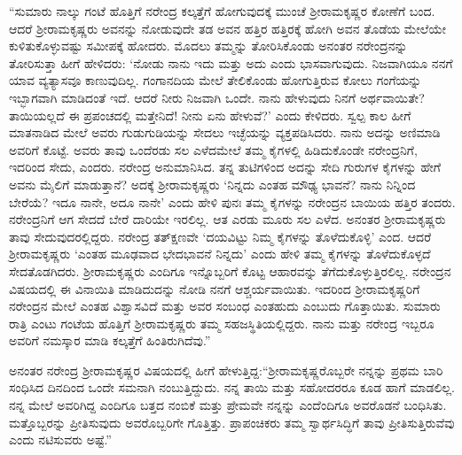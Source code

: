 “ಸುಮಾರು ನಾಲ್ಕು ಗಂಟೆ ಹೊತ್ತಿಗೆ ನರೇಂದ್ರ ಕಲ್ಕತ್ತೆಗೆ ಹೋಗುವುದಕ್ಕೆ ಮುಂಚೆ ಶ‍್ರೀರಾಮಕೃಷ್ಣರ ಕೋಣೆಗೆ ಬಂದ. ಆದರೆ ಶ‍್ರೀರಾಮಕೃಷ್ಣರು ಅವನನ್ನು ನೋಡುವುದೇ ತಡ ಅವನ ಹತ್ತಿರ ಹತ್ತಿರಕ್ಕೆ ಹೋಗಿ ಅವನ ತೊಡೆಯ ಮೇಲೆಯೇ ಕುಳಿತುಕೊಳ್ಳುವಷ್ಟು ಸಮೀಪಕ್ಕೆ ಹೋದರು. ಮೊದಲು ತಮ್ಮನ್ನು ತೋರಿಸಿಕೊಂಡು ಅನಂತರ ನರೇಂದ್ರನನ್ನು ತೋರಿಸುತ್ತಾ ಹೀಗೆ ಹೇಳಿದರು: ‘ನೋಡು ನಾನು ಇದು ಮತ್ತು ಅದು ಎಂದು ಭಾಸವಾಗುವುದು. ನಿಜವಾಗಿಯೂ ನನಗೆ ಯಾವ ವ್ಯತ್ಯಾಸವೂ ಕಾಣುವುದಿಲ್ಲ. ಗಂಗಾನದಿಯ ಮೇಲೆ ತೇಲಿಕೊಂಡು ಹೋಗುತ್ತಿರುವ ಕೋಲು ಗಂಗೆಯನ್ನು ಇಬ್ಭಾಗವಾಗಿ ಮಾಡಿದಂತೆ ಇದೆ. ಆದರೆ ನೀರು ನಿಜವಾಗಿ ಒಂದೇ. ನಾನು ಹೇಳುವುದು ನಿನಗೆ ಅರ್ಥವಾಯಿತೇ? ತಾಯಿಯಲ್ಲದೆ ಈ ಪ್ರಪಂಚದಲ್ಲಿ ಮತ್ತೇನಿದೆ! ನೀನು ಏನು ಹೇಳುವೆ?’ ಎಂದು ಕೇಳಿದರು. ಸ್ವಲ್ಪ ಕಾಲ ಹೀಗೆ ಮಾತನಾಡಿದ ಮೇಲೆ ಅವರು ಗುಡುಗುಡಿಯನ್ನು ಸೇದಲು ಇಚ್ಛೆಯನ್ನು ವ್ಯಕ್ತಪಡಿಸಿದರು. ನಾನು ಅದನ್ನು ಅಣಿಮಾಡಿ ಅವರಿಗೆ ಕೊಟ್ಟೆ. ಅವರು ತಾವು ಒಂದೆರಡು ಸಲ ಎಳೆದಮೇಲೆ ತಮ್ಮ ಕೈಗಳಲ್ಲಿ ಹಿಡಿದುಕೊಂಡೇ ನರೇಂದ್ರನಿಗೆ, ಇದರಿಂದ ಸೇದು, ಎಂದರು. ನರೇಂದ್ರ ಅನುಮಾನಿಸಿದ. ತನ್ನ ತುಟಿಗಳಿಂದ ಅದನ್ನು ಸೇದಿ ಗುರುಗಳ ಕೈಗಳನ್ನು ಹೇಗೆ ಅವನು ಮೈಲಿಗೆ ಮಾಡುತ್ತಾನೆ? ಅದಕ್ಕೆ ಶ‍್ರೀರಾಮಕೃಷ್ಣರು ‘ನಿನ್ನದು ಎಂತಹ ಮೌಢ್ಯ ಭಾವನೆ? ನಾನು ನಿನ್ನಿಂದ ಬೇರೆಯೆ? ಇದೂ ನಾನೇ, ಅದೂ ನಾನೇ’ ಎಂದು ಹೇಳಿ ಪುನಃ ತಮ್ಮ ಕೈಗಳನ್ನು ನರೇಂದ್ರನ ಬಾಯಿಯ ಹತ್ತಿರ ತಂದರು. ನರೇಂದ್ರನಿಗೆ ಆಗ ಸೇದದೆ ಬೇರೆ ದಾರಿಯೇ ಇರಲಿಲ್ಲ. ಆತ ಎರಡು ಮೂರು ಸಲ ಎಳೆದ. ಅನಂತರ ಶ‍್ರೀರಾಮಕೃಷ್ಣರು ತಾವು ಸೇದುವುದರಲ್ಲಿದ್ದರು. ನರೇಂದ್ರ ತತ್‍ಕ್ಷಣವೇ ‘ದಯವಿಟ್ಟು ನಿಮ್ಮ ಕೈಗಳನ್ನು ತೊಳೆದುಕೊಳ್ಳಿ’ ಎಂದ. ಆದರೆ ಶ‍್ರೀರಾಮಕೃಷ್ಣರು ‘ಎಂತಹ ಮೂಢವಾದ ಭೇದಭಾವನೆ ನಿನ್ನದು’ ಎಂದು ಹೇಳಿ ತಮ್ಮ ಕೈಗಳನ್ನು ತೊಳೆದುಕೊಳ್ಳದೆ ಸೇದತೊಡಗಿದರು. ಶ‍್ರೀರಾಮಕೃಷ್ಣರು ಎಂದಿಗೂ ಇನ್ನೊಬ್ಬರಿಗೆ ಕೊಟ್ಟ ಆಹಾರವನ್ನು ತೆಗೆದುಕೊಳ್ಳುತ್ತಿರಲಿಲ್ಲ. ನರೇಂದ್ರನ ವಿಷಯದಲ್ಲಿ ಈ ವಿನಾಯಿತಿ ಮಾಡಿದುದನ್ನು ನೋಡಿ ನನಗೆ ಆಶ್ಚರ್ಯವಾಯಿತು. ಇದರಿಂದ ಶ‍್ರೀರಾಮಕೃಷ್ಣರಿಗೆ ನರೇಂದ್ರನ ಮೇಲೆ ಎಂತಹ ವಿಶ್ವಾಸವಿದೆ ಮತ್ತು ಅವರ ಸಂಬಂಧ ಎಂತಹುದು ಎಂಬುದು ಗೊತ್ತಾಯಿತು. ಸುಮಾರು ರಾತ್ರಿ ಎಂಟು ಗಂಟೆಯ ಹೊತ್ತಿಗೆ ಶ‍್ರೀರಾಮಕೃಷ್ಣರು ತಮ್ಮ ಸಹಜಸ್ಥಿತಿಯಲ್ಲಿದ್ದರು. ನಾನು ಮತ್ತು ನರೇಂದ್ರ ಇಬ್ಬರೂ ಅವರಿಗೆ ನಮಸ್ಕಾರ ಮಾಡಿ ಕಲ್ಕತ್ತೆಗೆ ಹಿಂತಿರುಗಿದೆವು.”

ಅನಂತರ ನರೇಂದ್ರ ಶ‍್ರೀರಾಮಕೃಷ್ಣರ ವಿಷಯದಲ್ಲಿ ಹೀಗೆ ಹೇಳುತ್ತಿದ್ದ:\break “ಶ‍್ರೀರಾಮಕೃಷ್ಣ\-ರೊಬ್ಬರೇ ನನ್ನನ್ನು ಪ್ರಥಮ ಬಾರಿ ಸಂಧಿಸಿದ ದಿನದಿಂದ ಒಂದೇ ಸಮನಾಗಿ ನಂಬುತ್ತಿದ್ದುದು. ನನ್ನ ತಾಯಿ ಮತ್ತು ಸಹೋದರರೂ ಕೂಡ ಹಾಗೆ ಮಾಡಲಿಲ್ಲ. ನನ್ನ ಮೇಲೆ ಅವರಿಗಿದ್ದ ಎಂದಿಗೂ ಬತ್ತದ ನಂಬಿಕೆ ಮತ್ತು ಪ್ರೇಮವೇ ನನ್ನನ್ನು ಎಂದೆಂದಿಗೂ ಅವರೊಡನೆ ಬಂಧಿಸಿತು. ಮತ್ತೊಬ್ಬರನ್ನು ಪ್ರೀತಿಸುವುದು ಅವರೊಬ್ಬರಿಗೇ ಗೊತ್ತಿತ್ತು. ಪ್ರಾಪಂಚಿಕರು ತಮ್ಮ ಸ್ವಾರ್ಥಸಿದ್ಧಿಗೆ ತಾವು ಪ್ರೀತಿಸುತ್ತಿರುವೆವು ಎಂದು ನಟಿಸುವರು ಅಷ್ಟೆ.”

